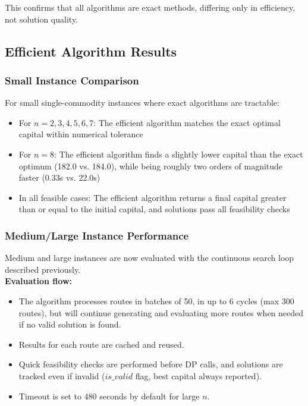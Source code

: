 \documentclass[12pt]{article}
\begin{document}
This confirms that all algorithms are exact methods, differing only in efficiency, not solution quality.

\subsection{Efficient Algorithm Results}

\subsubsection{Small Instance Comparison}

For small single-commodity instances where exact algorithms are tractable:

\begin{itemize}
    \item For $n = 2,3,4,5,6,7$: The efficient algorithm matches the exact optimal capital within numerical tolerance
    \item For $n = 8$: The efficient algorithm finds a slightly lower capital than the exact optimum (182.0 vs. 184.0), while being roughly two orders of magnitude faster (0.33s vs. 22.0s)
    \item In all feasible cases: The efficient algorithm returns a final capital greater than or equal to the initial capital, and solutions pass all feasibility checks
\end{itemize}

\subsubsection{Medium/Large Instance Performance}

Medium and large instances are now evaluated with the continuous search loop described previously.
\\
\textbf{Evaluation flow:}
\begin{itemize}
    \item The algorithm processes routes in batches of 50, in up to 6 cycles (max 300 routes), but will continue generating and evaluating more routes when needed if no valid solution is found.
    \item Results for each route are cached and reused.
    \item Quick feasibility checks are performed before DP calls, and solutions are tracked even if invalid ($is\_valid$ flag, best capital always reported).
    \item Timeout is set to 480 seconds by default for large $n$.
\end{itemize}
\end{document}
